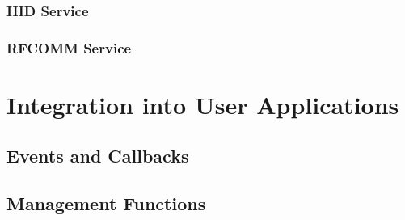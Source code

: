
\FloatBarrier
\subsubsection{HID Service}


\FloatBarrier
\subsubsection{RFCOMM Service}


\section{Integration into User Applications}


\FloatBarrier
\subsection{Events and Callbacks}


\FloatBarrier
\subsection{Management Functions}

